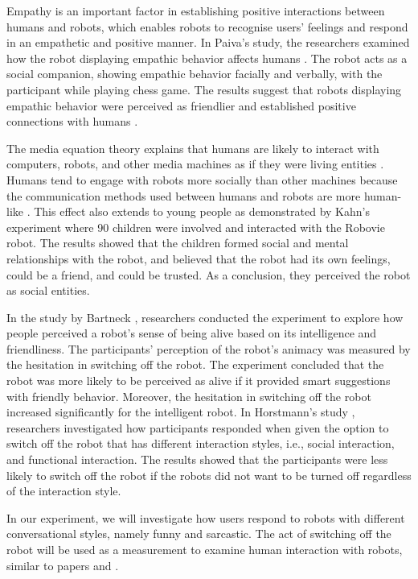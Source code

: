 \documentclass[conference]{IEEEtran}
\begin{document}
Empathy is an important factor in establishing positive interactions between humans and robots, which enables robots to recognise users’ feelings and respond in an empathetic and positive manner. In Paiva's study, the researchers examined how the robot displaying empathic behavior affects humans \cite{leite_influence_2013}. The robot acts as a social companion, showing empathic behavior facially and verbally, with the participant while playing chess game. The results suggest that  robots displaying empathic behavior were perceived as friendlier and established positive connections with humans \cite{leite_influence_2013}.

The media equation theory explains that humans are likely to interact with computers, robots, and other media machines as if they were living entities \cite{reeves_media_1996}. Humans tend to engage with robots more socially than other machines because the communication methods used between humans and robots are more human-like \cite{horstmann_robots_2018}. This effect also extends to young people as demonstrated by Kahn's experiment \cite{kahn_jr_robovie_2012} where 90 children were involved and interacted with the Robovie robot. The results showed that the children formed social and mental relationships with the robot, and believed that the robot had its own feelings, could be a friend, and could be trusted. As a conclusion, they perceived the robot as social entities.

In the study by Bartneck \cite{bartneck_daisy_2007}, researchers conducted the experiment to explore how people perceived a robot's sense of being alive based on its intelligence and friendliness. The participants' perception of the robot's animacy was measured by the hesitation in switching off the robot. The experiment concluded  that the robot was more likely to be perceived as alive if it provided smart suggestions with friendly behavior. Moreover, the hesitation in switching off the robot increased significantly for the intelligent robot. In Horstmann's study \cite{horstmann_robots_2018}, researchers investigated how participants responded when given the option to switch off the robot that has different interaction styles, i.e., social interaction, and functional interaction. The results showed that the participants were less likely to switch off the robot if the robots did not want to be turned off regardless of the interaction style.

In our experiment, we will investigate how users respond to robots with different conversational styles, namely funny and sarcastic. The act of switching off the robot will be used as a measurement to examine human interaction with robots, similar to papers \cite{horstmann_robots_2018} and \cite{bartneck_daisy_2007}.
\end{document}
